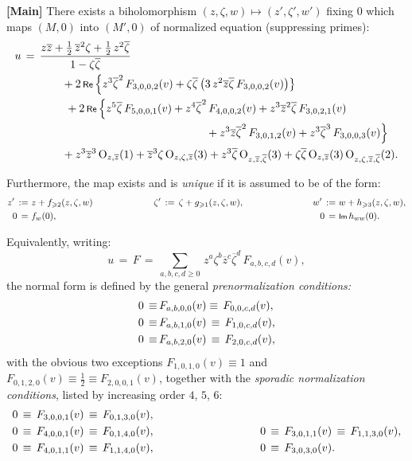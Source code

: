 \documentclass[12pt,twoside,leqno,openany]{amsart}
\begin{document}
\begin{Theorem}
{\bf [Main]}
There exists a biholomorphism $(z,\zeta,w) \longmapsto (z', \zeta',
w')$ fixing $0$ which maps $(M, 0)$ into $(M',0)$ of normalized
equation (suppressing primes):
\[
\aligned
u
&
\,=\,
\frac{z\overline{z}+\frac{1}{2}\,\overline{z}^2\zeta
+\frac{1}{2}\,z^2\overline{\zeta}}{1-\zeta\overline{\zeta}}
\\
&
\ \ \ \ \ \ \ \ \ \ \ 
+
2\,\Re\,
\Big\{
{z}^3{\overline{\zeta}}^2\,
F_{3,0,0,2}(v)
+
\zeta\overline{\zeta}\,
\big(
3\,{z}^2\overline{z}\overline{\zeta}\,
F_{3,0,0,2}(v)
\big)
\big\}
\notag
\\
&
\ \ \ \ \ \ \ \ \ \ \ \ 
+
2\,\Re\,
\Big\{
{z}^5\overline{\zeta}\,
F_{5,0,0,1}(v)
+
{z}^4{\overline{\zeta}}^2\,
F_{4,0,0,2}(v)
+
{z}^3{\overline{z}}^2\overline{\zeta}\,
F_{3,0,2,1}(v)
\\
&
\ \ \ \ \ \ \ \ \ \ \ \ \ \ \ \ \ \ \ \ \ \ \ \ \ \ \ \ \ \ \ \ \ \ \
\ \ \ \ \ \ \ \ \ \ \ \ \ \ \
+
{z}^3\overline{z}{\overline{\zeta}}^2\,
F_{3,0,1,2}(v)
+
{z}^3{\overline{\zeta}}^3\,
F_{3,0,0,3}(v)
\Big\}
\notag
\\
&
\ \ \ \ \ \ \ \ \ \ \ 
+
{z}^3{\overline{z}}^3\,
{\rm O}_{z,\overline{z}}(1)
+
{\overline{z}}^3\zeta\,
{\rm O}_{z,\zeta,\overline{z}}(3)
+
{z}^3\overline{\zeta}\,
{\rm O}_{z,\overline{z},\overline{\zeta}}(3)
+
\zeta\overline{\zeta}\,
{\rm O}_{z,\overline{z}}(3)\,
{\rm O}_{z,\zeta,\overline{z},\overline{\zeta}}(2).
\endaligned
\]

Furthermore, the map exists and is {\em unique} if it is assumed
to be of the form:
\[
\aligned
z'
\,:=\,
&\,
z
+
f_{\geqslant 2}(z,\zeta,w)
\ \ \ \ \ \ \ \ \ \ \ \ \ \ \ \ \ \ \ \
\zeta'
\,:=\,
\zeta
+
g_{\geqslant 1}(z,\zeta,w),
&
\ \ \ \ \ \ \ \ \ \ \ \ \ \ \ \ \ \ \ \
w'
\,:=\,
&\,
w
+
h_{\geqslant 3}(z,\zeta,w),
\\
0
\,=\,
&\,
f_w(0),
&
\ \ \ \ \ \ \ \ \ \ \ \ \ \ \ \ \ \ \ \
0
\,=\,
&\,
\Im\,h_{ww}(0).
\endaligned
\]
\end{Theorem}

Equivalently, writing:
\[
u
\,=\,
F
\,=\,
\sum_{a,b,c,d\geqslant 0}\,
z^a\zeta^b\overline{z}^c\overline{\zeta}^d\,
F_{a,b,c,d}(v),
\]
the normal form is defined by the general 
{\sl prenormalization conditions:}
\[
\aligned
0
\,\equiv\,
&
F_{a,b,0,0}(v)
\equiv\,
F_{0,0,c,d}(v),
\\
0
\,\equiv\,
&
F_{a,b,1,0}(v)
\,\equiv\,
F_{1,0,c,d}(v),
\\
0
\,\equiv\,
&
F_{a,b,2,0}(v)
\,\equiv\,
F_{2,0,c,d}(v),
\endaligned
\]
with the obvious two exceptions 
$F_{1,0,1,0}(v) \equiv 1$ and $F_{0,1,2,0}(v) \equiv
\frac{1}{2} \equiv F_{2,0,0,1}(v)$, together with the
{\sl sporadic normalization conditions}, listed by 
increasing order $4$, $5$, $6$:
\[
\aligned
0
&
\,\equiv\,
F_{3,0,0,1}(v)
\,\equiv\,
F_{0,1,3,0}(v),
&
\ \ \ \ \ \ \ \ \ \ \ \ \ \ \ \ \ \ \ \ \ \ \ \ \ \
&
\\
0
&
\,\equiv\,
F_{4,0,0,1}(v)
\,\equiv\,
F_{0,1,4,0}(v),
&
\ \ \ \ \ \ \ \ \ \ \ \ \ \ \ \ \ \ \ \ \ \ \ \ \ \
0
&
\,\equiv\,
F_{3,0,1,1}(v)
\,\equiv\,
F_{1,1,3,0}(v),
\\
0
&
\,\equiv\,
F_{4,0,1,1}(v)
\,\equiv\,
F_{1,1,4,0}(v),
&
\ \ \ \ \ \ \ \ \ \ \ \ \ \ \ \ \ \ \ \ \ \ \ \ \ \
0
&
\,\equiv\,
F_{3,0,3,0}(v).
\endaligned
\]
\end{document}
